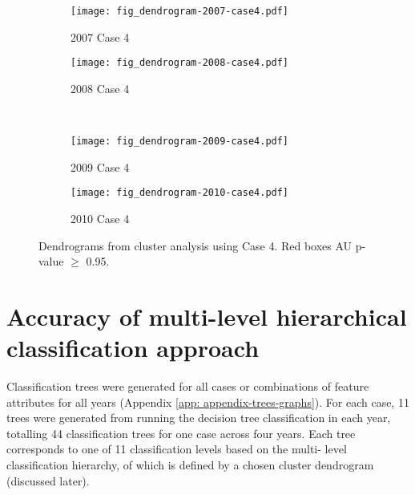 \begin{figure}[!ht] \centering
	\captionsetup[subfigure]{width=2.0in} %
	\begin{subfigure}[t]{0.49\textwidth}
		\texttt{[image: fig\_dendrogram-2007-case4.pdf]}
		\caption[Case 4 cluster dendrograms.]{2007 Case 4}
		\label{fig: result-fig4.11a}
	\end{subfigure}
	\begin{subfigure}[t]{0.49\textwidth}
		\texttt{[image: fig\_dendrogram-2008-case4.pdf]}
		\caption[Case 4 cluster dendrograms.]{2008 Case 4}
		\label{fig: result-fig4.11b}
	\end{subfigure}\\
	\vspace{15pt}
	\begin{subfigure}[t]{0.49\textwidth}
		\texttt{[image: fig\_dendrogram-2009-case4.pdf]}
		\caption[Case 4 cluster dendrograms.]{2009 Case 4}
		\label{fig: result-fig4.11c}
	\end{subfigure}
	\begin{subfigure}[t]{0.49\textwidth}
		\texttt{[image: fig\_dendrogram-2010-case4.pdf]}
		\caption[Case 4 cluster dendrograms.]{2010 Case 4}
		\label{fig: result-fig4.11d}
	\end{subfigure}
	\vspace{5pt}
	\caption[Dendrograms from cluster analysis using Case 4.]{Dendrograms from cluster analysis using Case 4. Red boxes AU p-value $\geq$ 0.95.}
	\label{fig: result-fig4.11}
\end{figure}

\section{Accuracy of multi-level hierarchical classification approach}
\label{sec: result-accuracy-hierarchical}

Classification trees were generated for all cases or combinations of feature attributes for all years (Appendix \ref{app: appendix-trees-graphs}). For each case, 11 trees were generated from running the decision tree classification in each year, totalling 44 classification trees for one case across four years. Each tree corresponds to one of 11 classification levels based on the multi- level classification hierarchy, of which is defined by a chosen cluster dendrogram (discussed later).

